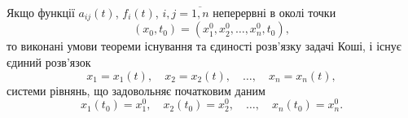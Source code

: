 Якщо функції $a_{ij}(t)$, $f_i(t)$, $i,j=\overline{1,n}$ неперервні в околі точки \[(x_0, t_0) = (x_1^0, x_2^0, \ldots, x_n^0, t_0),\] то виконані умови теореми існування та єдиності розв'язку задачі Коші, і існує єдиний розв'язок
\begin{equation*}
	x_1 = x_1(t), \quad x_2 = x_2(t), \quad \ldots, \quad x_n = x_n(t),
\end{equation*}
системи рівнянь, що задовольняє початковим даним
 \begin{equation*}
	x_1(t_0) = x_1^0, \quad x_2(t_0) = x_2^0, \quad \ldots, \quad x_n(t_0) = x_n^0.
\end{equation*}
